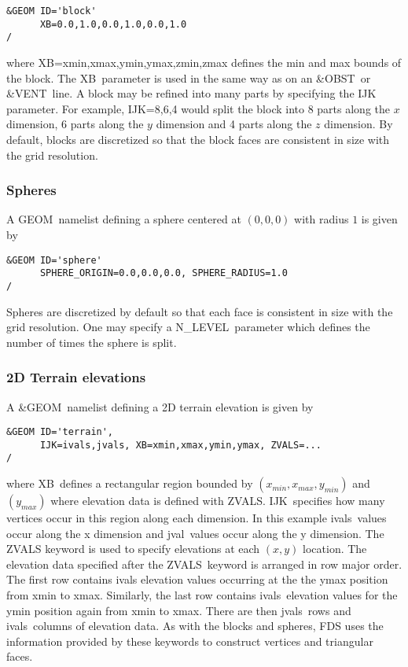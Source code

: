 \documentclass[12pt]{article}
\begin{document}
\begin{verbatim}
&GEOM ID='block'
      XB=0.0,1.0,0.0,1.0,0.0,1.0
/
\end{verbatim}

\noindent where {\ct XB=xmin,xmax,ymin,ymax,zmin,zmax} defines the min and max bounds of the block.
The {\ct XB}\ parameter is used in the same way as on an {\ct \&OBST}\ or {\ct \&VENT}\ line.
A block may be refined into many parts by specifying the {\ct IJK} parameter.
For example, {\ct IJK=8,6,4} would split the block into 8 parts along the $x$ dimension,
6 parts along the $y$ dimension and 4 parts along the $z$ dimension.
By default, blocks are discretized so that the block faces are consistent in size with the grid resolution.

\subsubsection{Spheres}
A {\ct GEOM}\ namelist defining a sphere centered at $(0,0,0)$ with radius $1$ is given by

\begin{verbatim}
&GEOM ID='sphere'
      SPHERE_ORIGIN=0.0,0.0,0.0, SPHERE_RADIUS=1.0
/
\end{verbatim}

\noindent Spheres are discretized by default so that each face is consistent in size with the grid resolution.
One may specify a {\ct N\_LEVEL}\ parameter which defines the number of times the sphere is split.

\subsubsection{2D Terrain elevations}
A {\ct \&GEOM}\ namelist defining a 2D terrain elevation is given by

\begin{verbatim}
&GEOM ID='terrain',
      IJK=ivals,jvals, XB=xmin,xmax,ymin,ymax, ZVALS=...
/
\end{verbatim}

\noindent where {\ct XB}\ defines a rectangular region bounded by $(x_{min}, x_{max}, y_{min})$ and $(y_{max})$
where elevation data is defined with {\ct ZVALS}.
{\ct IJK}\ specifies how many vertices occur in this region along each dimension.
In this example {\ct ivals}\ values occur along the x dimension and {\ct jval}\ values occur along the y dimension.
The {\ct ZVALS} keyword is used to specify elevations at each $(x,y)$ location.
The elevation data specified after the {\ct ZVALS}\ keyword is arranged in row major order.
The first row contains {\ct ivals} elevation values occurring at the the ymax position from xmin to xmax.
Similarly, the last row contains
{\ct ivals}\ elevation values for the ymin position again from xmin to xmax.
There are then {\ct jvals}\ rows and {\ct ivals}\ columns of elevation data.
As with the blocks and spheres, FDS uses the information provided by these keywords to construct
vertices and triangular faces.
\end{document}
